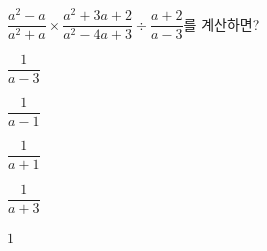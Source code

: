\hspace*{2mm}\begin{minipage}[t]{\dimexpr\linewidth-2mm\relax}\vspace{0pt}
$\dfrac{a^2-a}{a^2+a}\times\dfrac{a^2+3a+2}{a^2-4a+3}\div\dfrac{a+2}{a-3}$를 계산하면?
\begin{choices32}{\rule[-3ex]{0pt}{8ex}$\dfrac{1}{a-3}$}{\rule[-3ex]{0pt}{8ex}$\dfrac{1}{a-1}$}{\rule[-3ex]{0pt}{8ex}$\dfrac{1}{a+1}$}{\rule[-3ex]{0pt}{8ex}$\dfrac{1}{a+3}$}{\rule[-3ex]{0pt}{8ex}$1$}\end{choices32}\end{minipage}
